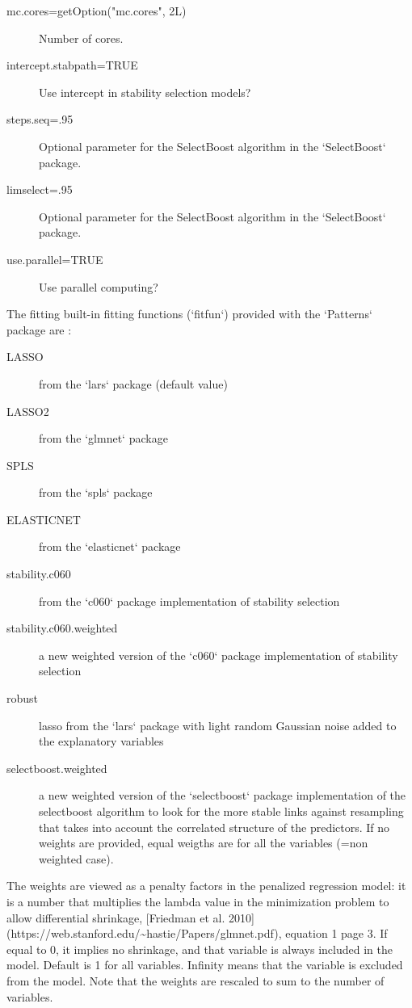 \documentclass[a4paper]{book}
\begin{document}
\begin{Arguments}
\begin{ldescription}
\begin{description}
\item[mc.cores=getOption("mc.cores", 2L)] Number of cores.
\item[intercept.stabpath=TRUE] Use intercept in stability selection models?
\item[steps.seq=.95] Optional parameter for the SelectBoost algorithm in the `SelectBoost` package.
\item[limselect=.95] Optional parameter for the SelectBoost algorithm in the `SelectBoost` package.
\item[use.parallel=TRUE] Use parallel computing?

\end{description}


\end{ldescription}
\end{Arguments}
%
\begin{Details}\relax
The fitting built-in fitting functions (`fitfun`) provided with the `Patterns` package are :
\begin{description}

\item[LASSO] from the `lars` package (default value)
\item[LASSO2] from the `glmnet` package
\item[SPLS] from the `spls` package
\item[ELASTICNET] from the `elasticnet` package
\item[stability.c060] from the `c060` package implementation of stability selection
\item[stability.c060.weighted] a new weighted version of the `c060` package implementation of stability selection
\item[robust] lasso from the `lars` package with light random Gaussian noise added to the explanatory variables
\item[selectboost.weighted] a new weighted version of the `selectboost` package implementation of the selectboost algorithm to look for the more stable links against resampling that takes into account the correlated structure of the predictors. If no weights are provided, equal weigths are for all the variables (=non weighted case).

\end{description}


The weights are viewed as a penalty factors in the penalized regression model: it is a number that multiplies the lambda value in the minimization problem to allow differential shrinkage, [Friedman et al. 2010](https://web.stanford.edu/\textasciitilde{}hastie/Papers/glmnet.pdf), equation 1 page 3. If equal to 0, it implies no shrinkage, and that variable is always included in the model. Default is 1 for all variables. Infinity means that the variable is excluded from the model. Note that the weights are rescaled to sum to the number of variables.
\end{Details}
\end{document}
